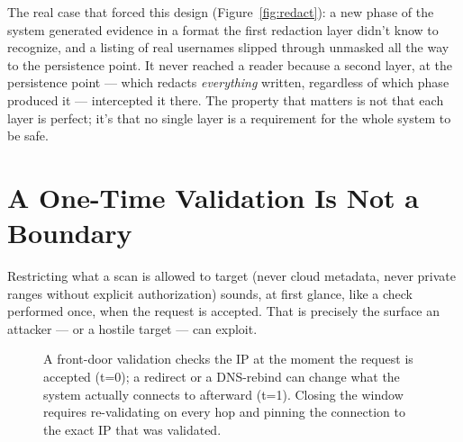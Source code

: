 \documentclass[10pt]{article}
\begin{document}
The real case that forced this design (Figure~\ref{fig:redact}): a new phase of the system generated evidence in a format the first redaction layer didn't know to recognize, and a listing of real usernames slipped through unmasked all the way to the persistence point. It never reached a reader because a second layer, at the persistence point --- which redacts \emph{everything} written, regardless of which phase produced it --- intercepted it there. The property that matters is not that each layer is perfect; it's that no single layer is a requirement for the whole system to be safe.

\section{A One-Time Validation Is Not a Boundary}

Restricting what a scan is allowed to target (never cloud metadata, never private ranges without explicit authorization) sounds, at first glance, like a check performed once, when the request is accepted. That is precisely the surface an attacker --- or a hostile target --- can exploit.

\begin{figure}[H]
\centering
{}
\caption{A front-door validation checks the IP at the moment the request is accepted (t=0); a redirect or a DNS-rebind can change what the system actually connects to afterward (t=1). Closing the window requires re-validating on every hop and pinning the connection to the exact IP that was validated.}
\label{fig:toctou}
\end{figure}
\end{document}

